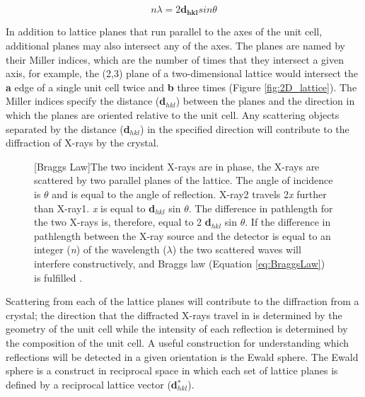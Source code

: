 \begin{equation}\label{eq:BraggsLaw}
n\lambda = 2 \mathbf{d_{hkl}} sin \theta
\end{equation}

In addition to lattice planes that run parallel to the axes of the unit cell, additional planes may also intersect any of the axes. The planes are named by their Miller indices, which are the number of times that they intersect a given axis, for example, the (2,3) plane of a two-dimensional lattice would intersect the \textbf{a} edge of a single unit cell twice and \textbf{b} three times (Figure \ref{fig:2D_lattice}). The Miller indices specify the distance (\textbf{d$_{hkl}$}) between the planes and the direction in which the planes are oriented relative to the unit cell. Any scattering objects separated by the distance (\textbf{d$_{hkl}$}) in the specified direction will contribute to the diffraction of X-rays by the crystal.  
\begin{figure}
  \begin{minipage}{\linewidth}

	[Braggs Law]{The two incident X-rays are in phase, the X-rays are scattered by two parallel planes of the lattice. The angle of incidence is $\theta$ and is equal to the angle of reflection. X-ray2 travels 2\textit{x} further than X-ray1. \textit{x} is equal to \textbf{d$_{hkl}$} sin $\theta$. The difference in pathlength for the two X-rays is, therefore, equal to 2 \textbf{d$_{hkl}$} sin $\theta$. If the difference in pathlength between the X-ray source and the detector is equal to an integer (\textit{n}) of the wavelength ($\lambda$) the two scattered waves will interfere  constructively, and Braggs law (Equation \ref{eq:BraggsLaw}) is fulfilled \cite{Bragg1913}.
	   \label{fig:Bragg}}	
\end{minipage} 
\end{figure}

Scattering from each of the lattice planes will contribute to the diffraction from a crystal; the direction that the diffracted X-rays travel in is determined by the geometry of the unit cell while the intensity of each reflection is determined by the composition of the unit cell. A useful construction for understanding which reflections will be detected in a given orientation is the Ewald sphere. The Ewald sphere is a construct in reciprocal space in which each set of lattice planes is defined by a reciprocal lattice vector (\textbf{d}$^{*}_{hkl}$).

